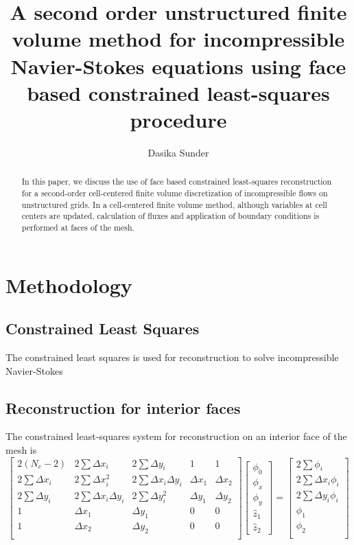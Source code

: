\documentclass[final,3p,review]{elsarticle}
\title{A second order unstructured finite volume method for incompressible Navier-Stokes equations using face based constrained least-squares procedure}
\author{Dasika Sunder}
\date{}
\begin{document}
	
	\begin{frontmatter}

	\begin{abstract}
		In this paper, we discuss the use of face based constrained least-squares reconstruction for a second-order cell-centered finite volume discretization of incompressible flows on unstructured grids. In a cell-centered finite volume method, although variables at cell centers are updated, calculation of fluxes and application of boundary conditions is performed at faces of the mesh. 
	\end{abstract}
	
	\end{frontmatter}

	
	\section{Methodology}
	
	
	
	\subsection{Constrained Least Squares}
	The constrained least squares is \cite{boyd2018introduction} used for reconstruction \cite{gradient-calculation-methods} to solve incompressible Navier-Stokes \cite{KIM2000411}
	
	\subsection{Reconstruction for interior faces}
	\noindent The constrained least-squares system for reconstruction on an interior face of the mesh is
	\begin{equation}
		\begin{bmatrix}
			2(N_c-2) & 2\sum \Delta x_i & 2\sum \Delta y_i & 1 & 1\\
			2\sum \Delta x_i & 2\sum \Delta x_i^2 & 2\sum \Delta x_i \Delta y_i & \Delta x_1 & \Delta x_2 \\
			2\sum \Delta y_i & 2\sum \Delta x_i \Delta y_i & 2\sum \Delta y_i^2 & \Delta y_1 & \Delta y_2 \\
			1 & \Delta x_1 & \Delta y_1 & 0 & 0 \\
			1 & \Delta x_2 & \Delta y_2 & 0 & 0 \\
		\end{bmatrix}
		\begin{bmatrix}
			\phi_0 \\
			\phi_x \\
			\phi_y \\
			\hat{z}_1 \\ 
			\hat{z}_2
		\end{bmatrix}	
		= 
		\begin{bmatrix}
			2\sum \phi_i \\
			2\sum \Delta x_i \phi_i  \\ 
			2\sum \Delta y_i \phi_i \\
			\phi_1 \\
			\phi_2 \\ 
		\end{bmatrix}	
	\end{equation}  
	
\end{document}
